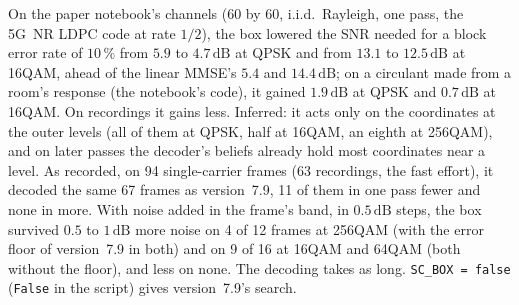 \documentclass[11pt,a4paper]{article}
\newcommand{\dB}{\,\mathrm{dB}}
\newcommand{\code}[1]{\texttt{#1}}
\theoremstyle{remark}
\begin{document}
On the paper notebook's channels (60 by 60, i.i.d.\ Rayleigh, one pass, the 5G~NR LDPC code at rate $1/2$), the box lowered the SNR needed for a block error rate of $10\,\%$ from $5.9$ to $4.7\dB$ at QPSK and from $13.1$ to $12.5\dB$ at 16QAM, ahead of the linear MMSE's $5.4$ and $14.4\dB$; on a circulant made from a room's response (the notebook's code), it gained $1.9\dB$ at QPSK and $0.7\dB$ at 16QAM. On recordings it gains less. Inferred: it acts only on the coordinates at the outer levels (all of them at QPSK, half at 16QAM, an eighth at 256QAM), and on later passes the decoder's beliefs already hold most coordinates near a level. As recorded, on 94 single-carrier frames (63 recordings, the fast effort), it decoded the same 67 frames as version~7.9, 11 of them in one pass fewer and none in more. With noise added in the frame's band, in $0.5\dB$ steps, the box survived $0.5$ to $1\dB$ more noise on 4 of 12 frames at 256QAM (with the error floor of version~7.9 in both) and on 9 of 16 at 16QAM and 64QAM (both without the floor), and less on none. The decoding takes as long. \code{SC\_BOX = false} (\code{False} in the script) gives version~7.9's search.
\end{document}
